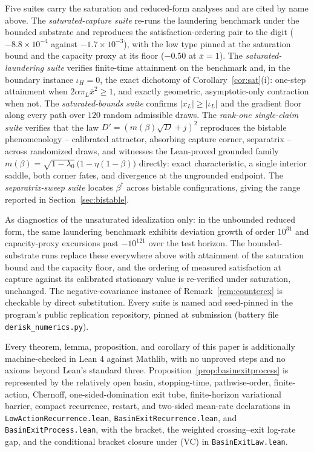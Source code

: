 \documentclass[11pt]{article}
\theoremstyle{definition}
\theoremstyle{remark}
\numberwithin{equation}{section}
\begin{document}
Five suites carry the saturation and reduced-form analyses and are cited by name above. The \emph{saturated-capture suite} re-runs the laundering benchmark under the bounded substrate and reproduces the satisfaction-ordering pair to the digit ($-8.8\times 10^{-4}$ against $-1.7\times 10^{-3}$), with the low type pinned at the saturation bound and the capacity proxy at its floor ($-0.50$ at $\bar x = 1$). The \emph{saturated-laundering suite} verifies finite-time attainment on the benchmark and, in the boundary instance $\iota_H = 0$, the exact dichotomy of Corollary~\ref{cor:sat}(i): one-step attainment when $2\alpha\pi_L\bar x^2 \ge 1$, and exactly geometric, asymptotic-only contraction when not. The \emph{saturated-bounds suite} confirms $|x_L| \ge |\iota_L|$ and the gradient floor along every path over $120$ random admissible draws. The \emph{rank-one single-claim suite} verifies that the law $D' = (m(\beta)\sqrt{D}+j)^2$ reproduces the bistable phenomenology -- calibrated attractor, absorbing capture corner, separatrix -- across randomized draws, and witnesses the Lean-proved grounded family $m(\beta)=\sqrt{1-\lambda_0}\,\bigl(1-\eta(1-\beta)\bigr)$ directly: exact characteristic, a single interior saddle, both corner fates, and divergence at the ungrounded endpoint. The \emph{separatrix-sweep suite} locates $\beta^\dagger$ across bistable configurations, giving the range reported in Section~\ref{sec:bistable}.

As diagnostics of the unsaturated idealization only: in the unbounded reduced form, the same laundering benchmark exhibits deviation growth of order $10^{31}$ and capacity-proxy excursions past $-10^{121}$ over the test horizon. The bounded-substrate runs replace these everywhere above with attainment of the saturation bound and the capacity floor, and the ordering of measured satisfaction at capture against its calibrated stationary value is re-verified under saturation, unchanged. The negative-covariance instance of Remark~\ref{rem:counterex} is checkable by direct substitution. Every suite is named and seed-pinned in the program's public replication repository, pinned at submission (battery file \texttt{derisk\_numerics.py}).

Every theorem, lemma, proposition, and corollary of this paper is additionally machine-checked in Lean 4 against Mathlib, with no unproved steps and no axioms beyond Lean's standard three. Proposition~\ref{prop:basinexitprocess} is represented by the relatively open basin, stopping-time, pathwise-order, finite-action, Chernoff, one-sided-domination exit tube, finite-horizon variational barrier, compact recurrence, restart, and two-sided mean-rate declarations in \texttt{LowActionRecurrence.lean}, \texttt{BasinExitRecurrence.lean}, and \texttt{BasinExitProcess.lean}, with the bracket, the weighted crossing--exit log-rate gap, and the conditional bracket closure under (VC) in \texttt{BasinExitLaw.lean}.
\end{document}
